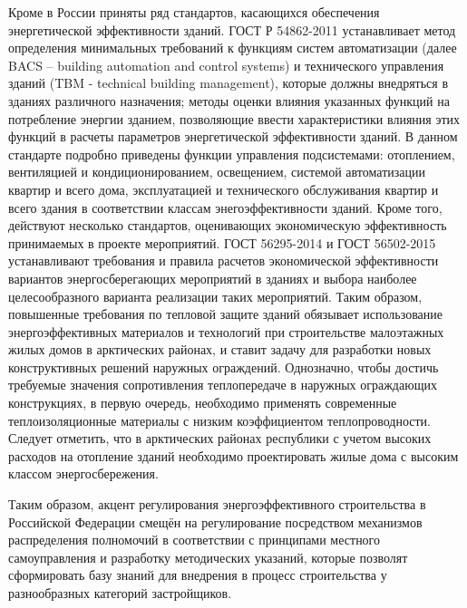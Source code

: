 Кроме в России приняты ряд стандартов, касающихся обеспечения энергетической эффективности зданий.
ГОСТ Р 54862-2011 \Code{[29]} устанавливает метод определения минимальных требований к функциям систем автоматизации
(далее BACS – building automation and control systems) и технического управления зданий (TBM - technical building management),
которые должны внедряться в зданиях различного назначения; методы оценки влияния указанных функций на потребление энергии зданием,
позволяющие ввести характеристики влияния этих функций в расчеты параметров энергетической эффективности зданий.
В данном стандарте подробно приведены функции управления подсистемами: отоплением, вентиляцией и кондиционированием, освещением, системой автоматизации квартир и всего дома, эксплуатацией и технического обслуживания квартир и всего здания в соответствии классам энегоэффективности зданий.
Кроме того, действуют несколько стандартов, оценивающих экономическую эффективность принимаемых в проекте мероприятий.
ГОСТ 56295-2014 \Code{[30]} и ГОСТ 56502-2015 \Code{[31]} устанавливают требования и правила расчетов экономической эффективности
вариантов энергосберегающих мероприятий в зданиях и выбора наиболее целесообразного варианта реализации таких мероприятий.
Таким образом, повышенные требования по тепловой защите зданий обязывает использование энергоэффективных материалов и технологий при строительстве малоэтажных жилых домов
в арктических районах, и ставит задачу для разработки новых конструктивных решений наружных ограждений.
Однозначно, чтобы достичь требуемые значения сопротивления теплопередаче в наружных ограждающих конструкциях, в первую очередь,
необходимо применять современные теплоизоляционные материалы с низким коэффициентом теплопроводности.
Следует отметить, что в арктических районах республики с учетом высоких расходов на отопление зданий необходимо проектировать жилые дома с высоким классом энергосбережения.


Таким образом, акцент регулирования энергоэффективного строительства в Российской Федерации смещён на регулирование посредством механизмов распределения полномочий в соответствии с принципами
местного самоуправления и разработку методических указаний, которые позволят сформировать базу знаний для внедрения в процесс строительства у разнообразных категорий застройщиков.





